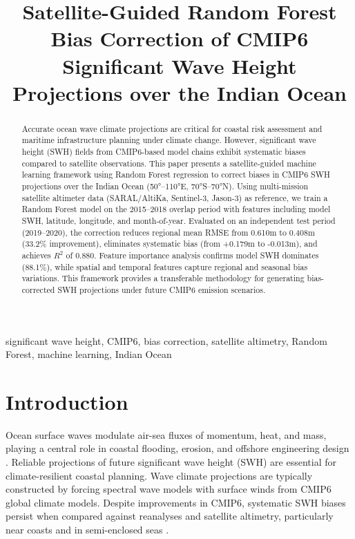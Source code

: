 \documentclass[conference]{IEEEtran}
\begin{document}
\title{Satellite-Guided Random Forest Bias Correction of CMIP6 Significant Wave Height Projections over the Indian Ocean}

\author{
}

\maketitle

\begin{abstract}
Accurate ocean wave climate projections are critical for coastal risk assessment and maritime infrastructure planning under climate change. However, significant wave height (SWH) fields from CMIP6-based model chains exhibit systematic biases compared to satellite observations. This paper presents a satellite-guided machine learning framework using Random Forest regression to correct biases in CMIP6 SWH projections over the Indian Ocean (50°--110°E, 70°S--70°N). Using multi-mission satellite altimeter data (SARAL/AltiKa, Sentinel-3, Jason-3) as reference, we train a Random Forest model on the 2015--2018 overlap period with features including model SWH, latitude, longitude, and month-of-year. Evaluated on an independent test period (2019--2020), the correction reduces regional mean RMSE from 0.610m to 0.408m (33.2\% improvement), eliminates systematic bias (from +0.179m to -0.013m), and achieves $R^2$ of 0.880. Feature importance analysis confirms model SWH dominates (88.1\%), while spatial and temporal features capture regional and seasonal bias variations. This framework provides a transferable methodology for generating bias-corrected SWH projections under future CMIP6 emission scenarios.
\end{abstract}

\begin{IEEEkeywords}
significant wave height, CMIP6, bias correction, satellite altimetry, Random Forest, machine learning, Indian Ocean
\end{IEEEkeywords}

\section{Introduction}

Ocean surface waves modulate air-sea fluxes of momentum, heat, and mass, playing a central role in coastal flooding, erosion, and offshore engineering design \cite{lemos2020}. Reliable projections of future significant wave height (SWH) are essential for climate-resilient coastal planning. Wave climate projections are typically constructed by forcing spectral wave models with surface winds from CMIP6 global climate models. Despite improvements in CMIP6, systematic SWH biases persist when compared against reanalyses and satellite altimetry, particularly near coasts and in semi-enclosed seas \cite{campos2018}.
\end{document}

